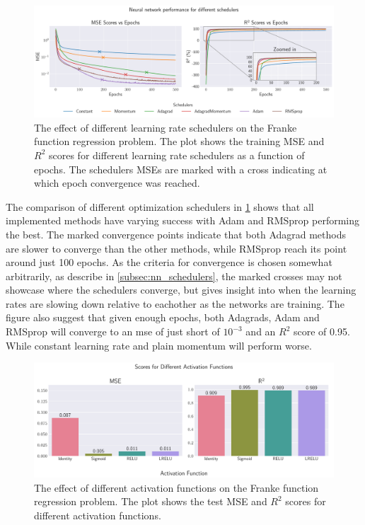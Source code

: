 \documentclass[aps,pra,english,notitlepage,reprint,nofootinbib]{revtex4-1}  %
\begin{document}
\onecolumngrid
\begin{figure}[h!]
    \centering
    \includegraphics[width = .9\textwidth]{../figs/b_schedulers.pdf}
    \caption{The effect of different learning rate schedulers on the Franke function regression problem. The plot shows the training MSE and \( R^2 \) scores for different learning rate schedulers as a function of epochs. The schedulers MSEs are marked with a cross indicating at which epoch convergence was reached.}
    \label{fig:NN_Franke_schedulers}
\end{figure}
\twocolumngrid

The comparison of different optimization schedulers in \cref{fig:NN_Franke_schedulers} shows that all implemented methods have varying success with Adam and RMSprop performing the best. The marked convergence points indicate that both Adagrad methods are slower to converge than the other methods, while RMSprop reach its point around just 100 epochs. As the criteria for convergence is chosen somewhat arbitrarily, as describe in \cref{subsec:nn_schedulers}, the marked crosses may not showcase where the schedulers converge, but gives insight into when the learning rates are slowing down relative to eachother as the networks are training. The figure also suggest that given enough epochs, both Adagrads, Adam and RMSprop will converge to an mse of just short of \( 10^{-3} \) and an \( R^2 \) score of 0.95. While constant learning rate and plain momentum will perform worse.

\onecolumngrid
\begin{figure}[h!]
    \centering
    \includegraphics[width = .9\textwidth]{../figs/c_activation_funcs.pdf}
    \caption{The effect of different activation functions on the Franke function regression problem. The plot shows the test MSE and \( R^2 \) scores for different activation functions.}
    \label{fig:NN_Franke_activation}
\end{figure}
\twocolumngrid
\end{document}
